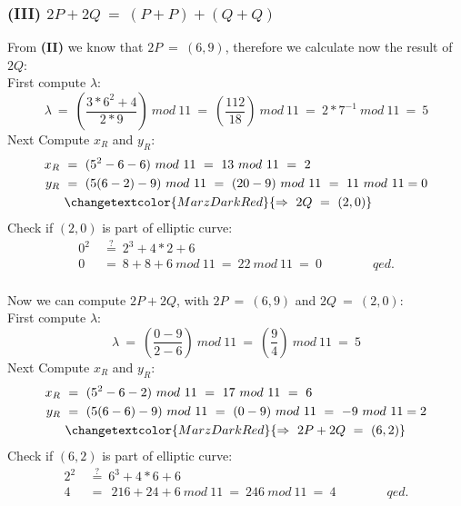 \documentclass{report}
\begin{document}
			\subsubsection{(III) $2P + 2Q \ = \ (P + P) + (Q + Q)$}
			\startsubsection
				From \textbf{(II)} we know that $2P \ = \ (6,9)$, therefore we calculate now the result of $2Q$: \\
				\startsubsection
					First compute $\lambda$:
					\[
						\lambda \ = \ \left( \frac{3*6^2 + 4}{2*9} \right) \ mod \ 11 \ = \ \left( \frac{112}{18} \right) \ mod \ 11 \ = \ 2 * 7^{-1} \ mod \ 11 \ = \ 5
					\]
					Next Compute $x_R$ and $y_R$:
					\begin{align*}
						x_R \ & = \ (5^2 - 6 - 6) \ mod \ 11 \ = \ 13 \ mod \ 11 \ = \ 2 \\
						y_R \ & = \ (5(6 - 2) - 9) \ mod \ 11 \ = \ (20 - 9) \ mod \ 11 \ = \ 11 \ mod \ 11 = 0 \\
						& \changetextcolor{MarzDarkRed}{\Rightarrow \ 2Q \ = \ (2, 0)}
					\end{align*}
					Check if $(2,0)$ is part of elliptic curve:
					\begin{align*}
						0^2\ & \stackrel{?}{=} \ 2^3 + 4 * 2 + 6 \\
						0 \ & = \ 8 + 8 + 6 \ mod \ 11 \ = \ 22 \ mod \ 11 \ = \ 0 \hspace{4em} qed.
					\end{align*}
				\closesection
				\hfill \\
				Now we can compute $2P + 2Q$, with $2P \ = \ (6,9)$ and $2Q \ = \ (2,0)$: \\
				\startsubsection
					First compute $\lambda$:
					\[
						\lambda \ = \ \left( \frac{0-9}{2-6} \right) \ mod \ 11 \ = \ \left( \frac{9}{4} \right) \ mod \ 11 \ = \ 5
					\]
					Next Compute $x_R$ and $y_R$:
					\begin{align*}
						x_R \ & = \ (5^2 - 6 - 2) \ mod \ 11 \ = \ 17 \ mod \ 11 \ = \ 6 \\
						y_R \ & = \ (5(6 - 6) - 9) \ mod \ 11 \ = \ (0 - 9) \ mod \ 11 \ = \ -9 \ mod \ 11 = 2 \\
						& \changetextcolor{MarzDarkRed}{\Rightarrow \ 2P + 2Q \ = \ (6, 2)}
					\end{align*}
					Check if $(6,2)$ is part of elliptic curve:
					\begin{align*}
						2^2\ & \stackrel{?}{=} \ 6^3 + 4 * 6 + 6 \\
						4 \ & = \ \ 216 + 24 + 6 \ mod \ 11 \ = \ 246 \ mod \ 11 \ = \ 4 \hspace{4em} qed.
					\end{align*}
				\closesection
			\closesection
		\closesection
	\closesection
\end{document}
